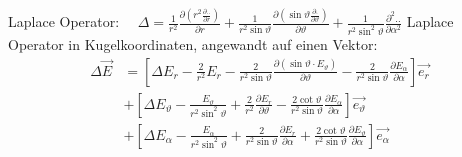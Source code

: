 Laplace Operator:   $\quad \Delta=\frac{1}{r^{2}} \frac{\partial\left(r^{2} \frac{\partial . .}{\partial r}\right)}{\partial r}+\frac{1}{r^{2} \sin \vartheta} \frac{\partial\left(\sin \vartheta \frac{\partial . \ddot{ }}{\partial \vartheta}\right)}{\partial \vartheta}+\frac{1}{r^{2} \sin ^{2} \vartheta} \frac{\partial^{2} . .}{\partial \alpha^{2}}$
Laplace Operator in Kugelkoordinaten, angewandt auf einen Vektor:
\begin{align*}
    \Delta \vec{E} &=\left[\Delta E_{r}-\frac{2}{r^{2}} E_{r}-\frac{2}{r^{2} \sin \vartheta} \frac{\partial\left(\sin \vartheta \cdot E_{\vartheta}\right)}{\partial \vartheta}-\frac{2}{r^{2} \sin \vartheta} \frac{\partial E_{\alpha}}{\partial \alpha}\right] \vec{e_{r}} \\
    &+\left[\Delta E_{\vartheta}-\frac{E_{\vartheta}}{r^{2} \sin ^{2} \vartheta}+\frac{2}{r^{2}} \frac{\partial E_{r}}{\partial \vartheta}-\frac{2 \cot \vartheta}{r^{2} \sin \vartheta} \frac{\partial E_{\alpha}}{\partial \alpha}\right] \vec{e_{\vartheta}} \\
    &+\left[\Delta E_{\alpha}-\frac{E_{\alpha}}{r^{2} \sin ^{2} \vartheta}+\frac{2}{r^{2} \sin \vartheta} \frac{\partial E_{r}}{\partial \alpha}+\frac{2 \cot \vartheta}{r^{2} \sin \vartheta} \frac{\partial E_{\vartheta}}{\partial \alpha}\right] \vec{e_{\alpha}}
\end{align*}

 
